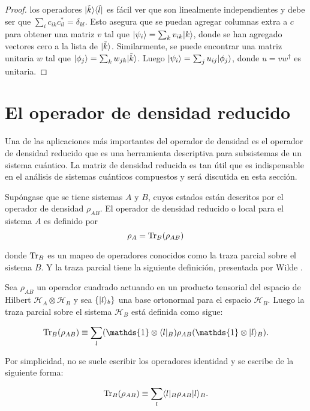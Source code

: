 \begin{proof}
	los operadores $|\tilde{k} \rangle \langle \tilde{l}|$ es fácil ver  que son linealmente independientes y debe ser que $\sum_i c_{ik}c_{il}^{*}=\delta_{kl}$. Esto asegura que se puedan agregar columnas extra a $c$ para obtener una matriz $v$ tal que $|\psi_i\rangle=\sum_{k}v_{ik}|k\rangle  $, donde se han agregado  vectores cero a la lista de $|\tilde{k}\rangle$. Similarmente, se puede encontrar una matriz unitaria $w$ tal que $|\phi_j\rangle=\sum_{k}w_{jk}|\tilde{k}\rangle$. Luego $|\psi_i\rangle=\sum_j u_{ij}|\phi_j\rangle$, donde  $u=vw^\dagger$ es unitaria. 
	\end{proof}

\section{El operador de densidad reducido} %

Una de las aplicaciones más importantes del operador de densidad es el operador de densidad reducido que es una herramienta descriptiva para subsistemas de un sistema cuántico. La matriz de densidad reducida es tan útil que es indispensable en el análisis de sistemas cuánticos compuestos y será discutida en esta sección.


Supóngase que se tiene sistemas $A$ y $B$, cuyos estados están descritos por el operador de densidad $\rho_{AB}$. El operador de densidad reducido o local para el sistema $A$ es definido por 
\begin{equation}
	\rho_A={\rm Tr}_B(\rho_{AB})
\end{equation}

donde ${\rm Tr}_B$ es un mapeo de operadores conocidos como la traza parcial sobre el sistema $B$. Y la traza parcial tiene la siguiente definición, presentada por Wilde {\cite{wilde2011classical}}.





\begin{definition}
	
	Sea  $ \rho_{AB}$ un operador cuadrado actuando en un producto tensorial del espacio de Hilbert $\mathcal{H}_A \otimes \mathcal{ H}_B$ y sea $\{|l\rangle_b\}$ una base ortonormal para el espacio $\mathcal{H}_B$. Luego la traza parcial sobre el sistema $\mathcal{H}_B$ está definida como sigue:
	
	\begin{equation}
		\tr_B(\rho_{AB})\equiv\sum_{l} (\mathds{1}\otimes\la l|_B)\rho_{AB}(\mathds{1}\otimes|l\ra_B).	
	\end{equation}

Por simplicidad, no se suele escribir los operadores identidad y se escribe de la siguiente forma:

\begin{equation}
	{\rm Tr}_B(\rho_{AB})\equiv\sum_{l} \langle l|_B\rho_{AB}|l\rangle_B.
\end{equation}

	\end{definition}


